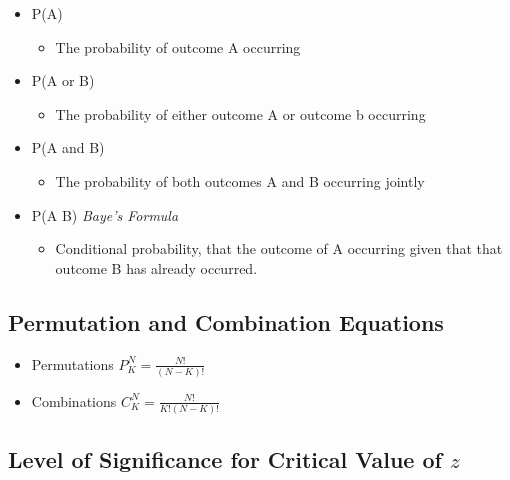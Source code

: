 \documentclass[]{article}
\begin{document}
\begin{itemize}
\itemsep1pt\parskip0pt
\item
  P(A)

  \begin{itemize}
  \itemsep1pt\parskip0pt
  \item
    The probability of outcome A occurring
  \end{itemize}
\item
  P(A or B)

  \begin{itemize}
  \itemsep1pt\parskip0pt
  \item
    The probability of either outcome A or outcome b occurring
  \end{itemize}
\item
  P(A and B)

  \begin{itemize}
  \itemsep1pt\parskip0pt
  \item
    The probability of both outcomes A and B occurring jointly
  \end{itemize}
\item
  P(A \textbar{} B) \emph{Baye's Formula}

  \begin{itemize}
  \itemsep1pt\parskip0pt
  \item
    Conditional probability, that the outcome of A occurring given that
    that outcome B has already occurred.
  \end{itemize}
\end{itemize}

\subsection{Permutation and Combination
Equations}\label{permutation-and-combination-equations}

\begin{itemize}
\item
  Permutations $P_K^N = \frac{N!}{(N-K)!}$
\item
  Combinations $C_K^N = \frac{N!}{K!(N-K)!}$
\end{itemize}

\subsection{Level of Significance for Critical Value of
$z$}\label{level-of-significance-for-critical-value-of-z}
\end{document}
